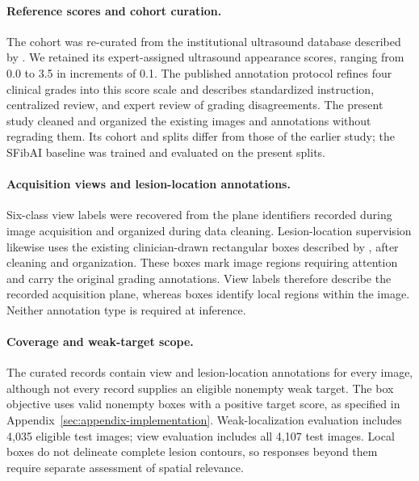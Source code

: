\paragraph{Reference scores and cohort curation.}
The cohort was re-curated from the institutional ultrasound database described by \citet{xu2026sfibai}. We retained its expert-assigned ultrasound appearance scores, ranging from 0.0 to 3.5 in increments of 0.1. The published annotation protocol refines four clinical grades into this score scale and describes standardized instruction, centralized review, and expert review of grading disagreements. The present study cleaned and organized the existing images and annotations without regrading them. Its cohort and splits differ from those of the earlier study; the SFibAI baseline was trained and evaluated on the present splits.

\paragraph{Acquisition views and lesion-location annotations.}
Six-class view labels were recovered from the plane identifiers recorded during image acquisition and organized during data cleaning. Lesion-location supervision likewise uses the existing clinician-drawn rectangular boxes described by \citet{xu2026sfibai}, after cleaning and organization. These boxes mark image regions requiring attention and carry the original grading annotations. View labels therefore describe the recorded acquisition plane, whereas boxes identify local regions within the image. Neither annotation type is required at inference.

\paragraph{Coverage and weak-target scope.}
The curated records contain view and lesion-location annotations for every image, although not every record supplies an eligible nonempty weak target. The box objective uses valid nonempty boxes with a positive target score, as specified in Appendix~\ref{sec:appendix-implementation}. Weak-localization evaluation includes 4,035 eligible test images; view evaluation includes all 4,107 test images. Local boxes do not delineate complete lesion contours, so responses beyond them require separate assessment of spatial relevance.
